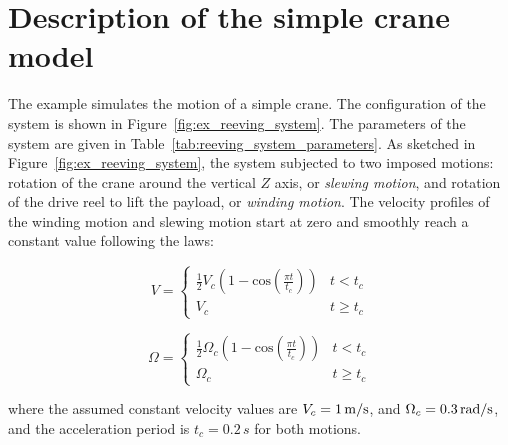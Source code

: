 \section{Description of the simple crane model}

The example simulates the motion of a simple crane. The configuration of the system is shown in Figure~\ref{fig:ex_reeving_system}. The parameters of the system are given in Table~\ref{tab:reeving_system_parameters}. As sketched in Figure~\ref{fig:ex_reeving_system}, the system subjected to two imposed motions: rotation of the crane around the vertical $Z$ axis, or \textit{slewing motion}, and rotation of the drive reel to lift the payload, or \textit{winding motion}. The velocity profiles of the winding motion and slewing motion start at zero and smoothly reach a constant value following the laws: 

\begin{equation}
V = \left\{ {\begin{array}{*{20}{c}}
\frac{1}{2}V_c(1-\text{cos}(\frac{\pi t}{t_c}))&t < t_c\\
V_c&t \ge t_c
\end{array}} \right.
 \label{eq:rotation_angle}
\end{equation}


\begin{equation}
\Omega = \left\{ {\begin{array}{*{20}{c}}
\frac{1}{2}\Omega_c(1-\text{cos}(\frac{\pi t}{t_c}))&t < t_c\\
\Omega_c&t \ge t_c
\end{array}} \right.
 \label{eq:rotation_angle}
\end{equation}

\setlength{\parindent}{0cm}
where the assumed constant velocity values are $V_c = 1\, {\rm{m}}/{{\rm{s}}}$, and $\Omega_c = 0.3\, {\rm{rad}}/{{\rm{s}}}$, and the acceleration period is $t_c = 0.2 \,s$ for both motions.

